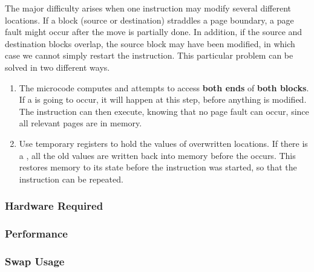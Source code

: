 The major difficulty arises when one instruction may modify several different locations.
If a block (source or destination) straddles a page boundary, a page fault might occur after the move is partially done.
In addition, if the source and destination blocks overlap, the source block may have been modified, in which case we cannot simply restart the instruction.
This particular problem can be solved in two different ways.
\begin{enumerate}[noitemsep]
\item The microcode computes and attempts to access \textbf{both ends} of \textbf{both blocks}.
  If a  is going to occur, it will happen at this step, before anything is modified.
  The instruction can then execute, knowing that no page fault can occur, since all relevant pages are in memory.
\item Use temporary registers to hold the values of overwritten locations.
  If there is a , all the old values are written back into memory before the  occurs.
  This restores memory to its state before the instruction was started, so that the instruction can be repeated.
\end{enumerate}

\subsubsection{Hardware Required}\label{subsubsec:Demand_Paging_Required_Hardware}
\subsubsection{Performance}\label{subsubsec:Demand_Paging_Performance}
\subsubsection{Swap Usage}\label{subsubsec:Demand_Paging_Swap_Usage}

